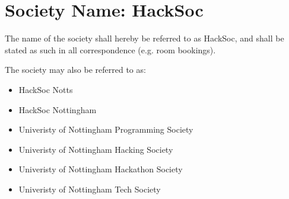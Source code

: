 \section{Society Name: HackSoc}
\begin{clause}
  The name of the society shall hereby be referred to as HackSoc, and shall be stated as such in all correspondence (e.g. room bookings).
\end{clause}

\begin{clause}
  The society may also be referred to as:
  \begin{itemize}
    \item HackSoc Notts
    \item HackSoc Nottingham
    \item Univeristy of Nottingham Programming Society
    \item Univeristy of Nottingham Hacking Society
    \item Univeristy of Nottingham Hackathon Society
    \item Univeristy of Nottingham Tech Society
  \end{itemize}
\end{clause}
  
